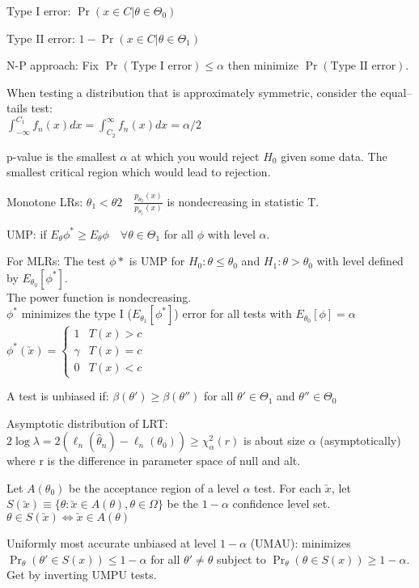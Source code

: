 \documentclass[notitlepage,10pt,twocolumn]{article}
\begin{document}
Type I error: $\Pr(x\in C| \theta \in \Theta_0)$

Type II error: $1 - \Pr(x \in C| \theta \in \Theta_1)$

N-P approach: Fix $\Pr(\text{Type I error}) \le \alpha$ then minimize $\Pr(\text{Type II error})$.

When testing a distribution that is approximately symmetric, consider the equal--tails test:\\
$\int_{-\infty}^{C_1}f_n(x)dx = \int_{C_2}^{\infty}f_n(x)dx = \alpha /2$

p-value is the smallest $\alpha$ at which you would reject $H_0$ given some data. The smallest critical region which would lead to rejection.

Monotone LRs: $\theta_1<\theta2\quad \frac{p_{\theta_2}(x)}{p_{\theta_1}(x)}$ is nondecreasing in statistic T.

UMP: if $E_\theta\phi^* \ge E_\theta \phi \quad \forall \theta \in \Theta_1$ for all $\phi$ with level $\alpha$.

For MLRs: The test $\phi*$ is UMP for $H_0: \theta \le \theta_0$ and $H_1: \theta>\theta_0$ with level defined by $E_{\theta_0}[\phi^*]$.\\
The power function is nondecreasing.\\
$\phi^*$ minimizes the type I ($E_{\theta_1}[\phi^*]$) error for all tests with $E_{\theta_0}[\phi]=\alpha$\\
$\phi^*(\utilde{x}) = \begin{cases}
1&T(x)>c\\
\gamma & T(x)=c\\
0&T(x)<c
\end{cases}$

A test is unbiased if: $\beta(\theta') \ge \beta(\theta'')$ for all $\theta' \in \Theta_1$ and $\theta'' \in \Theta_0$

Asymptotic distribution of LRT:\\ $2\log \lambda = 2(\ell_n(\hat{\theta}_n)-\ell_n(\theta_0)) \ge \chi^2_\alpha(r)$ is about size $\alpha$ (asymptotically) where r is the difference in parameter space of null and alt.

Let $A(\theta_0)$ be the acceptance region of a level $\alpha$ test. For each $\utilde{x}$, let $S(\utilde{x}) \equiv \{\theta : \utilde{x} \in A(\theta), \theta \in \Omega \}$ be the $1-\alpha$ confidence level set.\\
$\theta \in S(\utilde{x}) \iff \utilde{x} \in A(\theta)$

Uniformly most accurate unbiased at level $1-\alpha$ (UMAU): minimizes $\Pr_\theta(\theta' \in S(x)) \le 1-\alpha$ for all $\theta' \ne \theta$ subject to $\Pr_\theta(\theta \in S(x)) \ge 1-\alpha$. Get by inverting UMPU tests.
\end{document}
